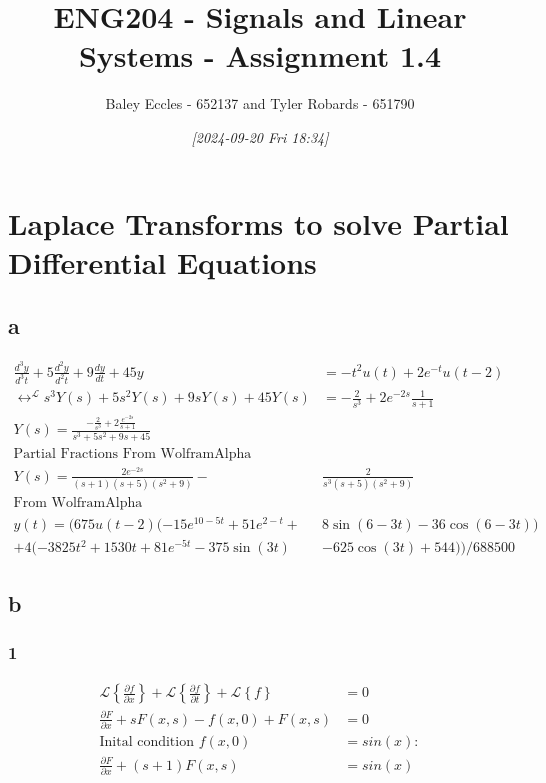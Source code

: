 \documentclass[11pt]{article}
\author{Baley Eccles - 652137 and Tyler Robards - 651790}
\date{\textit{{[}2024-09-20 Fri 18:34]}}
\title{ENG204 - Signals and Linear Systems - Assignment 1.4}
\begin{document}
\maketitle
\tableofcontents

\section{Laplace Transforms to solve Partial Differential Equations}
\label{sec:org10fdf15}
\subsection{a}
\label{sec:orga8c94fb}
\begin{align*}
\frac{d^3y}{d^3t}+5\frac{d^2y}{d^2t}+9\frac{dy}{dt}+45y &= -t^2u(t)+2e^{-t}u(t-2) \\
\leftrightarrow^{\mathcal{L}} s^3Y(s)+5s^2Y(s)+9sY(s)+45Y(s) &= -\frac{2}{s^{3}} +2e^{-2s}\frac{1}{s+1} \\
Y(s) = \frac{-\frac{2}{s^{3}} +2\frac{e^{-2s}}{s+1}}{s^3+5s^2+9s+45}&\\
\textrm{Partial Fractions From WolframAlpha}& \\
Y(s)=\frac{2e^{-2s}}{(s+1)(s+5)(s^2+9)}-&\frac{2}{s^3(s+5)(s^2+9)} \\
\textrm{From WolframAlpha}& \\
y(t)=(675 u(t - 2) (-15 e^{10 - 5 t} + 51 e^{2 - t} + &8 \sin(6 - 3 t) - 36 \cos(6 - 3 t)) \\
 + 4 (-3825 t^2 + 1530 t + 81 e^{-5 t} - 375 \sin(3 t)& - 625 \cos(3 t) + 544))/688500
\end{align*}
\subsection{b}
\label{sec:org178c534}
\subsubsection{1}
\label{sec:org11c2bad}
\begin{align*}
\mathcal{L}\left\{\frac{\partial f}{\partial x}\right\}+\mathcal{L}\left\{\frac{\partial f}{\partial t}\right\}+\mathcal{L}\left\{f\right\}&=0\\
\frac{\partial F}{\partial x}+sF(x,s)-f(x,0)+F(x,s)&=0\\
\textrm{Inital condition }f(x,0)&=sin(x):\\
\frac{\partial F}{\partial x}+(s+1)F(x,s)&=sin(x)
\end{align*}
\end{document}
